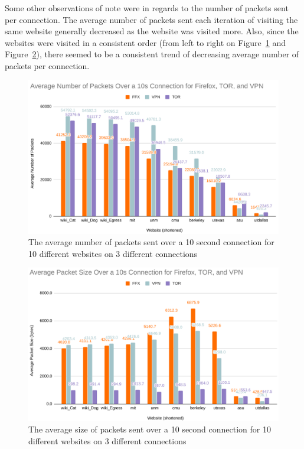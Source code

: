 \documentclass[11pt]{article}
\begin{document}
Some other observations of note were in regards to the number of packets sent per connection. The 
average number of packets sent each iteration of visiting the same website generally decreased as the
website was visited more. Also, since the websites were visited in a consistent order (from left to 
right on Figure~\ref{fig:avg_packets} and Figure~\ref{fig:avg_size}), there seemed to be a consistent
trend of decreasing average number of packets per connection. 
\begin{figure}[htbp]
  \centering
  \includegraphics[width=.91\linewidth]{./average_packets.png}
  \caption{\label{fig:avg_packets}
  The average number of packets sent over a 10 second connection for 10 different websites on 3 different connections}
\end{figure}
\begin{figure}[!hbtp]
  \centering
  \includegraphics[width=.91\linewidth]{./average_size.png}
  \caption{\label{fig:avg_size}
  The average size of packets sent over a 10 second connection for 10 different websites on 3 different connections}
\end{figure}
\end{document}
